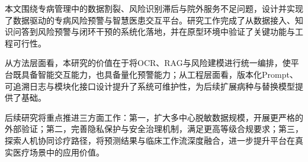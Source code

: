 本文围绕专病管理中的数据割裂、风险识别滞后与院外服务不足问题，设计并实现了数据驱动的专病风险预警与智慧医患交互平台。研究工作完成了从数据接入、知识问答到风险预警与闭环干预的系统化落地，并在原型环境中验证了关键功能与工程可行性。

从方法层面看，本研究的价值在于将OCR、RAG与风险建模进行统一编排，使平台既具备智能交互能力，也具备量化预警能力；从工程层面看，版本化Prompt、可追溯日志与模块化接口设计提升了系统可维护性，为后续扩展病种与替换模型提供了基础。

后续研究将重点推进三方面工作：第一，扩大多中心脱敏数据规模，开展更严格的外部验证；第二，完善隐私保护与安全治理机制，满足更高等级合规要求；第三，探索人机协同诊疗路径，将预测结果与临床工作流深度融合，进一步提升平台在真实医疗场景中的应用价值。